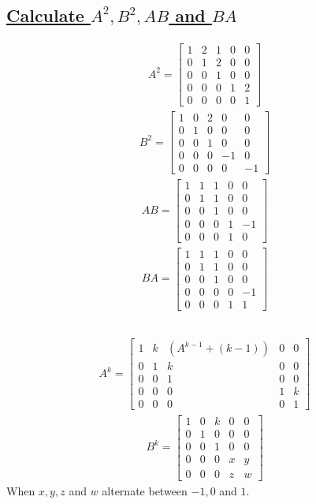 \documentclass[a4paper, 12pt]{article}
\newcommand{\sub}[1]{\subsection{\underline{#1}}}
\newcommand{\eq}[1]{\begin{align*}#1\end{align*}}
\begin{document}
\begin{titlepage}
    
\end{titlepage}

\setcounter{section}{1}
\section{}
\sub{Calculate $A^2, B^2, AB$ and $BA$}
\eq{
    A^2=\begin{bmatrix}
        1&2&1&0&0\\
        0&1&2&0&0\\
        0&0&1&0&0\\
        0&0&0&1&2\\
        0&0&0&0&1
    \end{bmatrix}
}
\eq{
    B^2=\begin{bmatrix}
        1&0&2&0&0\\
        0&1&0&0&0\\
        0&0&1&0&0\\
        0&0&0&-1&0\\
        0&0&0&0&-1
    \end{bmatrix}
}
\eq{
    AB=\begin{bmatrix}
        1&1&1&0&0\\
        0&1&1&0&0\\
        0&0&1&0&0\\
        0&0&0&1&-1\\
        0&0&0&1&0
    \end{bmatrix}
}
\eq{
    BA=\begin{bmatrix}
        1&1&1&0&0\\
        0&1&1&0&0\\
        0&0&1&0&0\\
        0&0&0&0&-1\\
        0&0&0&1&1
    \end{bmatrix}
}
\sub{}
\eq{
    A^k=\begin{bmatrix}
        1&k&(A^{k-1}+(k-1))&0&0\\
        0&1&k&0&0\\
        0&0&1&0&0\\
        0&0&0&1&k\\
        0&0&0&0&1
    \end{bmatrix}
}
\eq{
    B^k=\begin{bmatrix}
        1&0&k&0&0\\
        0&1&0&0&0\\
        0&0&1&0&0\\
        0&0&0&x&y\\
        0&0&0&z&w
    \end{bmatrix}
}
When $x,y,z$ and $w$ alternate between $-1, 0$ and $1$.
\pagebreak
\end{document}
